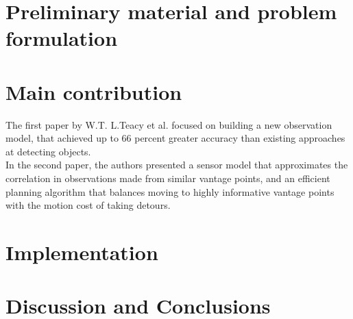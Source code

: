 \documentclass{article}
\begin{document}
	\section{Preliminary material and problem formulation}
	\section{Main contribution}
	The first paper by W.T. L.Teacy et al. focused on building a new observation model, that achieved up to 66 percent greater accuracy than existing approaches at detecting objects. \\
	
	In the second paper, the authors presented a sensor model that approximates the correlation in observations made from similar vantage points, and an efficient planning algorithm that balances moving to highly informative vantage points with the motion cost of taking detours.
	
	\section{Implementation}
	\section{Discussion and Conclusions}
	
  
\end{document}
